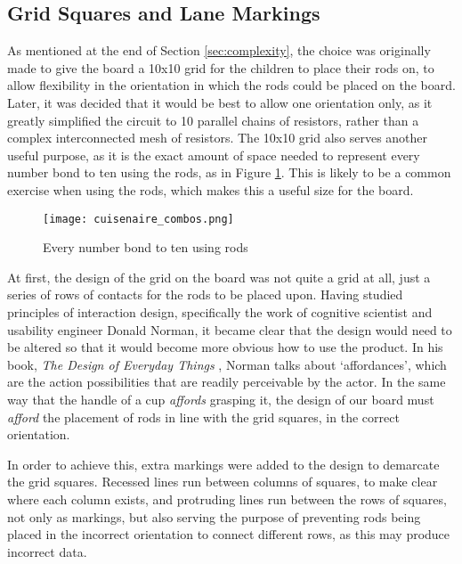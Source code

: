 \subsection{Grid Squares and Lane Markings}

As mentioned at the end of Section \ref{sec:complexity}, the choice was originally made to give the board a 10x10 grid for the children to place their rods on, to allow flexibility in the orientation in which the rods could be placed on the board. Later, it was decided that it would be best to allow one orientation only, as it greatly simplified the circuit to 10 parallel chains of resistors, rather than a complex interconnected mesh of resistors. The 10x10 grid also serves another useful purpose, as it is the exact amount of space needed to represent every number bond to ten using the rods, as in Figure \ref{fig:cuisenaire_combos}. This is likely to be a common exercise when using the rods, which makes this a useful size for the board.


\begin{figure}[H]
	\begin{center}
	\texttt{[image: cuisenaire\_combos.png]}\\ 
  	\caption{Every number bond to ten using rods}
    \label{fig:cuisenaire_combos}
    \end{center}
\end{figure}

At first, the design of the grid on the board was not quite a grid at all, just a series of rows of contacts for the rods to be placed upon.
Having studied principles of interaction design, specifically the work of cognitive scientist and usability engineer Donald Norman, it became clear that the design would need to be altered so that it would become more obvious how to use the product. In his book, \emph{The Design of Everyday Things} \cite{donaldnorman2002}, Norman talks about `affordances', which are the action possibilities that are readily perceivable by the actor. In the same way that the handle of a cup \emph{affords} grasping it, the design of our board must \emph{afford} the placement of rods in line with the grid squares, in the correct orientation.

In order to achieve this, extra markings were added to the design to demarcate the grid squares. Recessed lines run between columns of squares, to make clear where each column exists, and protruding lines run between the rows of squares, not only as markings, but also serving the purpose of preventing rods being placed in the incorrect orientation to connect different rows, as this may produce incorrect data. 

